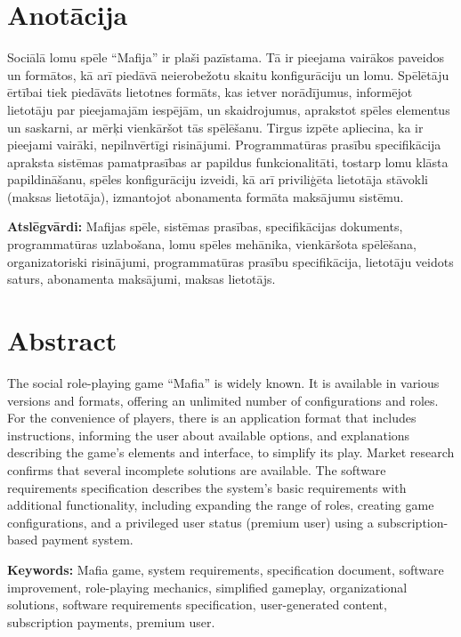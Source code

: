 \section*{Anotācija}
\setcounter{page}{2}
Sociālā lomu spēle ``Mafija'' ir plaši pazīstama.
Tā ir pieejama vairākos paveidos un formātos, kā arī piedāvā neierobežotu skaitu konfigurāciju un lomu.
Spēlētāju ērtībai tiek piedāvāts lietotnes formāts, kas ietver norādījumus, informējot lietotāju par pieejamajām iespējām, un skaidrojumus, aprakstot spēles elementus un saskarni, ar mērķi vienkāršot tās spēlēšanu.
Tirgus izpēte apliecina, ka ir pieejami vairāki, nepilnvērtīgi risinājumi.
Programmatūras prasību specifikācija apraksta sistēmas pamatprasības ar papildus funkcionalitāti, tostarp lomu klāsta papildināšanu, spēles konfigurāciju izveidi, kā arī priviliģēta lietotāja stāvokli (maksas lietotāja), izmantojot abonamenta formāta maksājumu sistēmu.

\textbf{Atslēgvārdi:}
Mafijas spēle, sistēmas prasības, specifikācijas dokuments, programmatūras uzlabošana, lomu spēles mehānika, vienkāršota spēlēšana, organizatoriski risinājumi, programmatūras prasību specifikācija, lietotāju veidots saturs, abonamenta maksājumi, maksas lietotājs.

\section*{Abstract}
The social role-playing game ``Mafia'' is widely known.
It is available in various versions and formats, offering an unlimited number of configurations and roles.
For the convenience of players, there is an application format that includes instructions, informing the user about available options, and explanations describing the game's elements and interface, to simplify its play.
Market research confirms that several incomplete solutions are available.
The software requirements specification describes the system's basic requirements with additional functionality, including expanding the range of roles, creating game configurations, and a privileged user status (premium user) using a subscription-based payment system.

\textbf{Keywords:}
Mafia game, system requirements, specification document, software improvement, role-playing mechanics, simplified gameplay, organizational solutions, software requirements specification, user-generated content, subscription payments, premium user.
